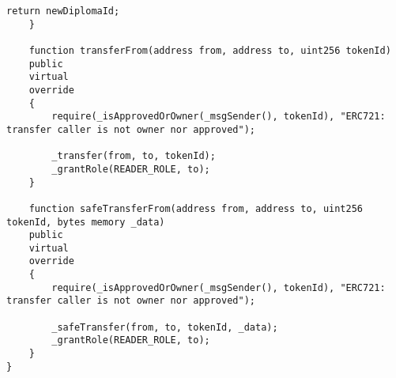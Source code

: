\begin{lstlisting}[caption=Код смарт-контракта учебного заведения, label = list3, style=realcode]
		return newDiplomaId;
	}
	
	function transferFrom(address from, address to, uint256 tokenId)
	public
	virtual
	override
	{
		require(_isApprovedOrOwner(_msgSender(), tokenId), "ERC721: transfer caller is not owner nor approved");
		
		_transfer(from, to, tokenId);    
		_grantRole(READER_ROLE, to);
	}
	
	function safeTransferFrom(address from, address to, uint256 tokenId, bytes memory _data)
	public
	virtual
	override
	{
		require(_isApprovedOrOwner(_msgSender(), tokenId), "ERC721: transfer caller is not owner nor approved");
		
		_safeTransfer(from, to, tokenId, _data);
		_grantRole(READER_ROLE, to);
	}
}

\end{lstlisting}







